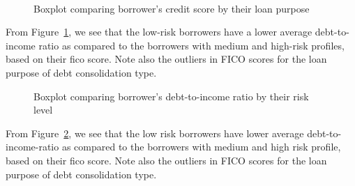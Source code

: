 \documentclass[
  letterpaper,
  DIV=11,
  numbers=noendperiod]{scrartcl}
\begin{document}
~

\begin{figure}


\caption{\label{fig-fico_purpose}Boxplot comparing borrower's credit
score by their loan purpose}

\end{figure}%

From Figure~\ref{fig-fico_purpose}, we see that the low-risk borrowers
have a lower average debt-to-income ratio as compared to the borrowers
with medium and high-risk profiles, based on their fico score. Note also
the outliers in FICO scores for the loan purpose of debt consolidation
type.

\begin{figure}


\caption{\label{fig-dti_risk}Boxplot comparing borrower's debt-to-income
ratio by their risk level}

\end{figure}%

From Figure~\ref{fig-dti_risk}, we see that the low risk borrowers have
lower average debt-to-income-ratio as compared to the borrowers with
medium and high risk profile, based on their fico score. Note also the
outliers in FICO scores for the loan purpose of debt consolidation type.
\end{document}
